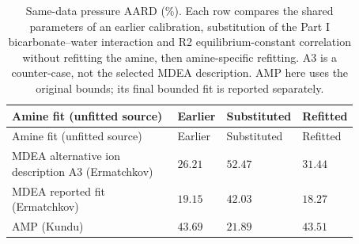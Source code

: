 \begingroup\small\setlength{\tabcolsep}{3pt}
\begin{longtable}{@{}>{\raggedright\arraybackslash}p{0.48\linewidth}>{\raggedright\arraybackslash}p{0.13\linewidth}>{\raggedright\arraybackslash}p{0.13\linewidth}>{\raggedright\arraybackslash}p{0.13\linewidth}@{}}
\caption{Same-data pressure AARD (\%). Each row compares the shared parameters of an earlier calibration, substitution of the Part I bicarbonate--water interaction and R2 equilibrium-constant correlation without refitting the amine, then amine-specific refitting. A3 is a counter-case, not the selected MDEA description. AMP here uses the original bounds; its final bounded fit is reported separately.}\label{tab:p2-shared-sensitivity}\\
\toprule Amine fit (unfitted source) & Earlier & Substituted & Refitted \\ \midrule\endfirsthead
\toprule Amine fit (unfitted source) & Earlier & Substituted & Refitted \\ \midrule\endhead
\bottomrule\endfoot
MDEA alternative ion description A3 (Ermatchkov) & $26.21$ & $52.47$ & $31.44$ \\
MDEA reported fit (Ermatchkov) & $19.15$ & $42.03$ & $18.27$ \\
AMP (Kundu) & $43.69$ & $21.89$ & $43.51$ \\
\end{longtable}\endgroup
